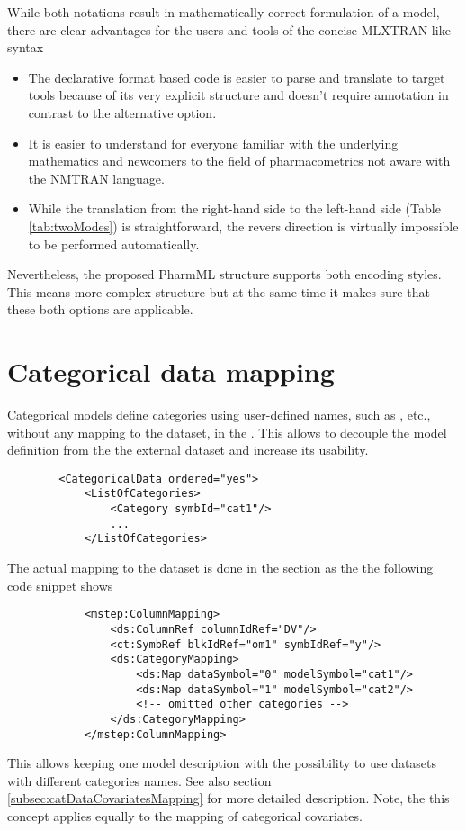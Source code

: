 
While both notations result in mathematically correct formulation of a model, there are clear 
advantages for the users and tools of the concise MLXTRAN-like syntax
\begin{itemize}
\item
The declarative format based code is easier to parse and translate to target tools because 
of its very explicit structure and doesn't require annotation in contrast to the alternative option.
\item
It is easier to understand for everyone familiar with the underlying mathematics and newcomers 
to the field of pharmacometrics not aware with the NMTRAN language.
\item
While the translation from the right-hand side to the left-hand side (Table \ref{tab:twoModes})
is straightforward, the revers direction is virtually impossible to be performed automatically.
\end{itemize}
Nevertheless, the proposed PharmML structure supports both encoding styles.  \marginpar{\HandCuffLeft} 
This means more complex structure but at the same time it makes sure that these both options 
are applicable. 

\section{Categorical data mapping}
\label{sec:catDataMapping}
Categorical models define categories using user-defined names, such as ,  
etc., without any mapping to the dataset, in the . This allows to decouple 
the model definition from the the external dataset and increase its usability.
\lstset{language=XML}
\begin{lstlisting}
        <CategoricalData ordered="yes">
            <ListOfCategories> 
                <Category symbId="cat1"/>
                ...
            </ListOfCategories>
\end{lstlisting}
The actual mapping to the dataset is done in the  section as the the following
code snippet shows
\lstset{language=XML}
\begin{lstlisting}
            <mstep:ColumnMapping>
                <ds:ColumnRef columnIdRef="DV"/>
                <ct:SymbRef blkIdRef="om1" symbIdRef="y"/>
                <ds:CategoryMapping>
                    <ds:Map dataSymbol="0" modelSymbol="cat1"/>
                    <ds:Map dataSymbol="1" modelSymbol="cat2"/>
                    <!-- omitted other categories -->
                </ds:CategoryMapping>
            </mstep:ColumnMapping>
\end{lstlisting}
This allows keeping one model description with the possibility to use datasets
with different categories names. See also section \ref{subsec:catDataCovariatesMapping}
for more detailed description. Note, the this concept applies equally to the mapping of categorical 
covariates.

